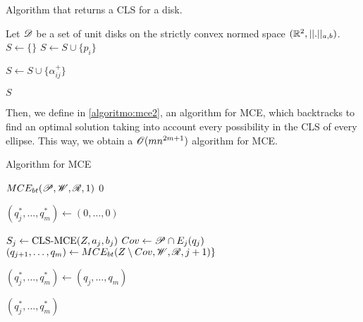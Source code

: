 \begin{algoritmo}
	\caption{Algorithm that returns a CLS for a disk.}\label{algoritmo:mce_cls}
	\begin{algorithmic}[1]
		
		\item[]
		
		\State Let $\mathscr{D}$ be a set of unit disks on the strictly convex normed space $(\mathbb{R}^2, ||.||_{a,b})$.
		\State $S \gets \{\}$
		\State $S \gets S \cup \{p_i\}$
		

		\State $S \gets S \cup \{\alpha_{ij}^+\}$	

		\EndFor
		\EndFor
		
		\State \Return $S$
		\EndProcedure
	\end{algorithmic}
\end{algoritmo}

Then, we define in \autoref{algoritmo:mce2}, an algorithm for MCE, which backtracks to find an optimal solution taking into account every possibility in the CLS of every ellipse. This way, we obtain a $\mathscr{O}(mn^{2m+1})$ algorithm for MCE.

\begin{algoritmo}
	\caption{Algorithm for MCE}\label{algoritmo:mce2}
	
	\begin{algorithmic}[1]
		
		
		\item[]
		\State \Return $MCE_{bt}(\mathscr{P}, \mathscr{W}, \mathscr{R}, 1)$
		\EndProcedure
		\State
		\State \Return $0$
		\EndIf
		
		\State $(q_j^*, \dots, q_m^*) \gets (0, \dots, 0)$
		
		\State $S_j \gets \textnormal{CLS-MCE}(Z, a_j, b_j)$
		\State $Cov \gets \mathscr{P} \cap E_j(q_j)$
		\State $(q_{j+1}, \dots, q_m) \gets MCE_{bt}(Z \setminus Cov, \mathscr{W}, \mathscr{R}, j+1)\}$
		
		\State $(q_j^*, \dots, q_m^*) \gets(q_j, \dots, q_m)$
		\EndIf
		\EndFor
		
		\State \Return $(q_j^*, \dots, q_m^*)$
		\EndProcedure
	\end{algorithmic}
\end{algoritmo}